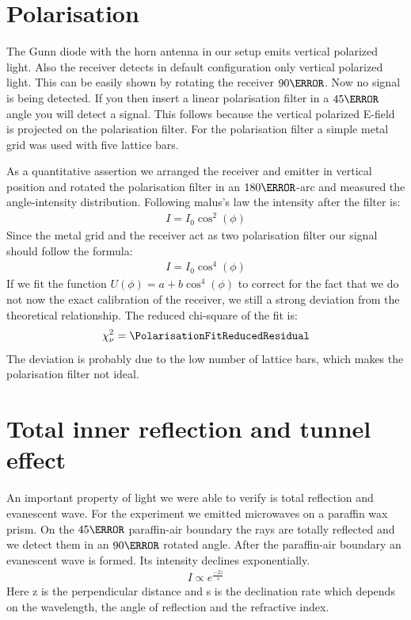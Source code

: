 \documentclass[a4paper,10pt,twocolumn]{article}
\begin{document}
    \section{Polarisation}
    The Gunn diode with the horn antenna in our setup emits vertical polarized light.
    Also the receiver detects in default configuration only vertical polarized light.
    This can be easily shown by rotating the receiver $ 90\degree$.
    Now no signal is being detected.
    If you then insert a linear polarisation filter in a $ 45\degree$ angle you will detect a signal.
    This follows because the vertical polarized E-field is projected on the polarisation filter.
    For the polarisation filter a simple metal grid was used with five lattice bars.

    As a quantitative assertion we arranged the receiver and emitter in vertical position and rotated the polarisation
    filter in an $ 180\degree $-arc and measured the angle-intensity distribution.
    Following malus's law the intensity after the filter is:
    \begin{align*}
        I = I_0 \cos^2(\phi)
    \end{align*}
    Since the metal grid and the receiver act as two polarisation filter our signal should follow the formula:
    \begin{align*}
        I = I_0 \cos^4( \phi )
    \end{align*}
    If we fit the function $U(\phi) = a + b \cos^4(\phi)$ to correct for the fact that we do not now the exact calibration 
    of the receiver, we still a strong deviation from the theoretical relationship.
    The reduced chi-square of the fit is:
    \begin{align*}
        \chi_{\nu}^2 = \PolarisationFitReducedResidual
    \end{align*}
    The deviation is probably due to the low number of lattice bars, which makes the polarisation filter not ideal.
    \section{Total inner reflection and tunnel effect}
    An important property of light we were able to verify is total reflection and evanescent wave.
    For the experiment we emitted microwaves on a paraffin wax prism. 
    On the $45\degree$ paraffin-air boundary the rays are totally reflected and we detect them in an $90\degree$ rotated
    angle. 
    After the paraffin-air boundary an evanescent wave is formed.
    Its intensity declines exponentially.
    \begin{align*}
        I \propto e^{\frac{-2z}{s}} 
    \end{align*}
    Here z is the perpendicular distance and s is the declination rate which depends on the wavelength, 
    the angle of reflection and the refractive index.
\end{document}
